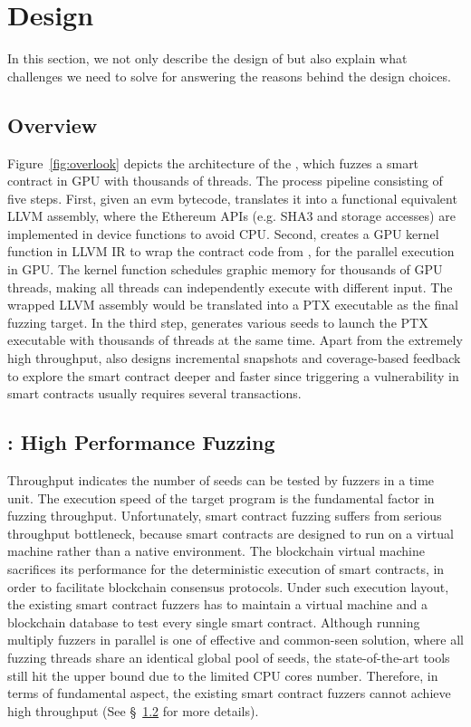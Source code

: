 \section{Design}
In this section, we not only describe the design of  {\tool} but also explain what challenges we need to solve for answering the reasons behind the design choices.  

\subsection{Overview}
Figure~\ref{fig:overlook} depicts the architecture of the {\tool}, which fuzzes a smart contract in GPU with thousands of threads.  
%
The process pipeline consisting of five steps. 
%
First, given an evm bytecode, {\translator} translates it into a functional equivalent LLVM assembly, where the Ethereum APIs (e.g. SHA3 and storage accesses) are implemented in device functions to avoid CPU.
%
Second, {\wrapper} creates a GPU kernel function in LLVM IR to wrap the contract code from {\translator}, for the parallel execution in GPU. The kernel function schedules graphic memory for thousands of GPU threads, making all threads can independently execute with different input. The wrapped LLVM assembly would be translated into a PTX executable as the final fuzzing target. 
%
In the third step, {\runner} generates various seeds to launch the PTX executable with thousands of threads at the same time. Apart from the extremely high throughput, {\runner} also designs incremental snapshots and coverage-based feedback to explore the smart contract deeper and faster since triggering a vulnerability in smart contracts usually requires several transactions\cite{}. 

\subsection{{\runner}: High Performance Fuzzing}
Throughput indicates the number of seeds can be tested by fuzzers in a time unit. The execution speed of the target program is the fundamental factor in fuzzing throughput. 
Unfortunately, smart contract fuzzing suffers from serious throughput bottleneck, because smart contracts are designed to run on a virtual machine rather than a native environment. 
The blockchain virtual machine sacrifices its performance for the deterministic execution of smart contracts, in order to facilitate blockchain consensus protocols.
%
Under such execution layout, the existing smart contract fuzzers has to maintain a virtual machine and a blockchain database to test every single smart contract\cite{}. 
%
Although running multiply fuzzers in parallel is one of effective and common-seen solution\cite{confuzzius,echidna,afl,libFuzzer,angora,enfuzz}, where all fuzzing threads share an identical global pool of seeds, the state-of-the-art tools still hit the upper bound due to the limited CPU cores number.
%
Therefore, in terms of fundamental aspect, the existing smart contract fuzzers cannot achieve high throughput (See \S~\ref{} for more details).
%

